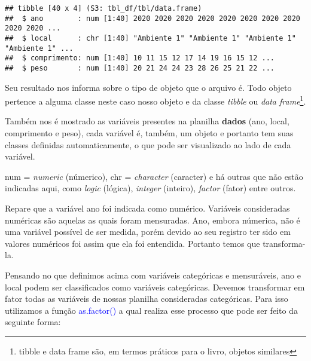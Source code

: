\documentclass[14pt,titlepage, oneside, openany, a4paper]{book}
\newenvironment{Shaded}{\begin{snugshade}}{\end{snugshade}}
\newcommand{\KeywordTok}[1]{\textcolor[rgb]{0.13,0.29,0.53}{\textbf{#1}}}
\newcommand{\NormalTok}[1]{#1}
\newcommand{\OperatorTok}[1]{\textcolor[rgb]{0.81,0.36,0.00}{\textbf{#1}}}
\newcommand{\StringTok}[1]{\textcolor[rgb]{0.31,0.60,0.02}{#1}}
\begin{document}
\begin{verbatim}
## tibble [40 x 4] (S3: tbl_df/tbl/data.frame)
##  $ ano        : num [1:40] 2020 2020 2020 2020 2020 2020 2020 2020 2020 2020 ...
##  $ local      : chr [1:40] "Ambiente 1" "Ambiente 1" "Ambiente 1" "Ambiente 1" ...
##  $ comprimento: num [1:40] 10 11 15 12 17 14 19 16 15 12 ...
##  $ peso       : num [1:40] 20 21 24 24 23 28 26 25 21 22 ...
\end{verbatim}

Seu resultado nos informa sobre o tipo de objeto que o arquivo é. Todo objeto pertence a alguma classe neste caso nosso objeto e da classe \emph{tibble} ou \emph{data frame}\footnote{tibble e data frame são, em termos práticos para o livro, objetos similares}.

Também nos é mostrado as variáveis presentes na planilha \textbf{dados} (ano, local, comprimento e peso), cada variável é, também, um objeto e portanto tem suas classes definidas automaticamente, o que pode ser visualizado ao lado de cada variável.

num = \emph{numeric} (númerico), chr = \emph{character} (caracter) e há outras que não estão indicadas aqui, como \emph{logic} (lógica), \emph{integer} (inteiro), \emph{factor} (fator) entre outros.

Repare que a variável ano foi indicada como numérico. Variáveis consideradas numéricas são aquelas as quais foram mensuradas. Ano, embora númerica, não é uma variável possível de ser medida, porém devido ao seu registro ter sido em valores numéricos foi assim que ela foi entendida. Portanto temos que transforma-la.

Pensando no que definimos acima com variáveis categóricas e mensuráveis, ano e local podem ser classificados como variáveis categóricas. Devemos transformar em fator todas as variáveis de nossas planilha consideradas categóricas. Para isso utilizamos a função \textcolor{blue}{as.factor()} a qual realiza esse processo que pode ser feito da seguinte forma:

\begin{Shaded}
\end{Shaded}
\end{document}
